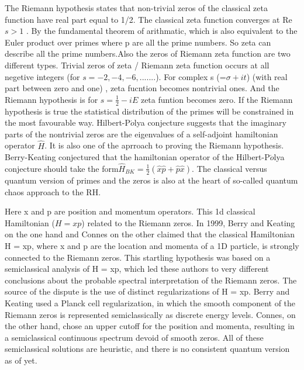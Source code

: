 \documentclass[12pt, letterpaper]{article}
\newcommand*{\1}{\hspace{1pt}}
\begin{document}
\begin{mdframed}[hidealllines=true,backgroundcolor=blue!20]
    The Riemann hypothesis states that non-trivial zeros of the classical zeta function have real part equal to 1/2. The classical zeta function converges at
    Re $s > 1$ . By the fundamental theorem of arithmatic, which is also equivalent to the Euler product over primes where p are all the prime numbers. So zeta 
    can describe all the prime numbers.Also the zeros of Riemann zeta function are two different types. Trivial zeros of zeta / Riemann zeta function occurs at all negetive integers (for $s = -2, -4, -6, .......$). 
    For complex s (=$\sigma + it $) (with real part between zero and one) , zeta fucntion becomes nontrivial ones. And the Riemann hypothesis is for $s=\frac{1}{2}-iE$
    zeta funtion becomes zero. If the Riemann hypothesis is true the statistical distribution of the primes will be constrained 
    in the most favourable way. Hilbert-P$\acute{o}$lya conjecture suggests that the imaginary parts of the nontrivial zeros are the eigenvalues 
    of a self-adjoint hamiltonian operator $\hat{H}$. It is also one of the aprroach to proving the Riemann hypothesis. Berry-Keating conjectured that the hamiltonian operator
    of the Hilbert-P$\acute{o}$lya  conjecture should take the form\cite{s1}$\hat{H} _{BK} = \frac{1}{2}(\hat{x}\hat{p} + \hat{p}\hat{x})$.
    The classical versus quantum version of primes and the zeros is also at the heart of so-called quantum chaos approach to the RH.

    Here x and p are position and momentum operators. This 1d classical Hamiltonian ($H = xp$) related to the Riemann zeros.\cite{s1}
    In 1999, Berry and Keating\cite{s1,s15} on the one hand and Connes\cite{s3} on the other claimed that the classical Hamiltonian H = xp, 
    where x and p are the location and momenta of a 1D particle, is strongly connected to the Riemann zeros. This startling 
    hypothesis was based on a semiclassical analysis of H = xp, which led these authors to very different conclusions about 
    the probable spectral interpretation of the Riemann zeros. The source of the dispute is the use of distinct 
    regularizations of H = xp. Berry and Keating used a Planck cell regularization, in which the smooth component of the
    Riemann zeros is represented semiclassically as discrete energy levels. Connes, on the other hand, chose an upper 
    cutoff for the position and momenta, resulting in a semiclassical continuous spectrum devoid of smooth zeros.
    All of these semiclassical solutions are heuristic, and there is no consistent quantum version as of yet.




\end{mdframed}
\end{document}
